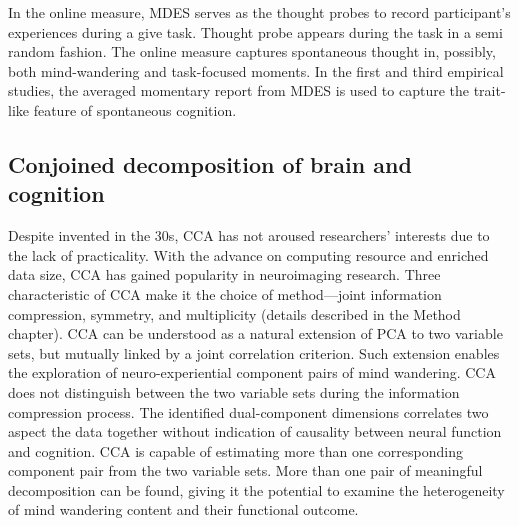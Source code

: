 In the online measure, MDES serves as the thought probes to record participant's experiences during a give task. Thought probe appears during the task in a semi random fashion. The online measure captures spontaneous thought in, possibly, both mind-wandering and task-focused moments. In the first and third empirical studies, the averaged momentary report from MDES is used to capture the trait-like feature of spontaneous cognition.


\subsection{Conjoined decomposition of brain and cognition}

Despite invented in the 30s, CCA has not aroused researchers’ interests due to the lack of practicality. With the advance on computing resource and enriched data size, CCA has gained popularity in neuroimaging research. Three characteristic of CCA make it the choice of method---joint information compression, symmetry, and multiplicity (details described in the Method chapter). CCA can be understood as a natural extension of PCA to two variable sets, but mutually linked by a joint correlation criterion. Such extension enables the exploration of neuro-experiential component pairs of mind wandering. CCA does not distinguish between the two variable sets during the information compression process. The identified dual-component dimensions correlates two aspect the data together without indication of causality between neural function and cognition. CCA is capable of estimating more than one corresponding component pair from the two variable sets. More than one pair of meaningful decomposition can be found, giving it the potential to examine the heterogeneity of mind wandering content and their functional outcome. 

